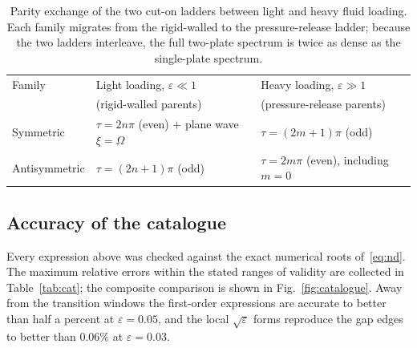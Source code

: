 \documentclass[11pt,a4paper]{article}
\newcommand{\Om}{\Omega}
\newcommand{\eps}{\varepsilon}
\theoremstyle{plain}
\theoremstyle{remark}
\begin{document}
\begin{table}[htb]
\centering
\small
\begin{tabular}{@{}lll@{}}
\toprule
Family & Light loading, $\eps\ll1$ & Heavy loading, $\eps\gg1$\\
 & (rigid-walled parents) & (pressure-release parents)\\
\midrule
Symmetric & $\tau=2n\pi$ (even) $+$ plane wave $\xi=\Om$ & $\tau=(2m{+}1)\pi$ (odd)\\
Antisymmetric & $\tau=(2n{+}1)\pi$ (odd) & $\tau=2m\pi$ (even), including $m=0$\\
\bottomrule
\end{tabular}
\caption{Parity exchange of the two cut-on ladders between light and heavy fluid loading. Each family
migrates from the rigid-walled to the pressure-release ladder; because the two ladders interleave, the
full two-plate spectrum is twice as dense as the single-plate spectrum.}
\label{tab:migration}
\end{table}

\subsection{Accuracy of the catalogue}
Every expression above was checked against the exact numerical roots of~\eqref{eq:nd}. The maximum
relative errors within the stated ranges of validity are collected in Table~\ref{tab:cat}; the
composite comparison is shown in Fig.~\ref{fig:catalogue}. Away from the transition windows the
first-order expressions are accurate to better than half a percent at $\eps=0.05$, and the local
$\sqrt\eps$ forms reproduce the gap edges to better than $0.06\%$ at $\eps=0.03$.
\end{document}
